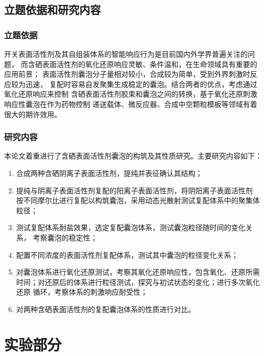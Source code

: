 \documentclass[bachelor,winfonts,replaceperiod]{jnuthesis}
\begin{document}
    \section{立题依据和研究内容}
    \subsection{立题依据}
    开关表面活性剂及其自组装体系的智能响应行为是目前国内外学界普遍关注的问题，
    而含硒表面活性剂的氧化还原响应灵敏、条件温和，在生命领域具有重要的应用前景；
    表面活性剂囊泡分子量相对较小，合成较为简单，受到外界刺激时反应较为迅速，
    复配时容易自发聚集生成稳定的囊泡。结合两者的优点，考虑通过氧化还原响应来控制
    含硒表面活性剂胶束和囊泡之间的转换，基于氧化还原刺激响应性囊泡在作为药物控制
    递送载体、微反应器、合成中空颗粒模板等领域有着很大的期许效用。
    
    \subsection{研究内容}
    本论文着重进行了含硒表面活性剂囊泡的构筑及其性质研究。主要研究内容如下：
    \begin{enumerate}
        \item 合成两种含硒阴离子表面活性剂，提纯并表征确认其结构；
        \item 提纯与阴离子表面活性剂复配的阳离子表面活性剂，将阴阳离子表面活性剂
        按不同摩尔比进行复配以构筑囊泡，采用动态光散射测试复配体系中的聚集体粒径；
        \item 测试复配体系耐盐效果，选定复配囊泡体系，测试囊泡粒径随时间的变化关系，
        考察囊泡的稳定性；
        \item 配置不同浓度的表面活性剂复配体系，测试其中囊泡的粒径变化关系；
        \item 对囊泡体系进行氧化还原测试，考察其氧化还原响应性，包含氧化、还原所需
        时间；对还原后的体系进行粒径测试，探究与初试状态的变化；进行多次氧化还原
        循环，考察体系的刺激响应耐受性；
        \item 对两种含硒表面活性剂的复配囊泡体系的性质进行对比。
    \end{enumerate}
    
    \chapter{实验部分}\label{chapter:experiment}
\end{document}
